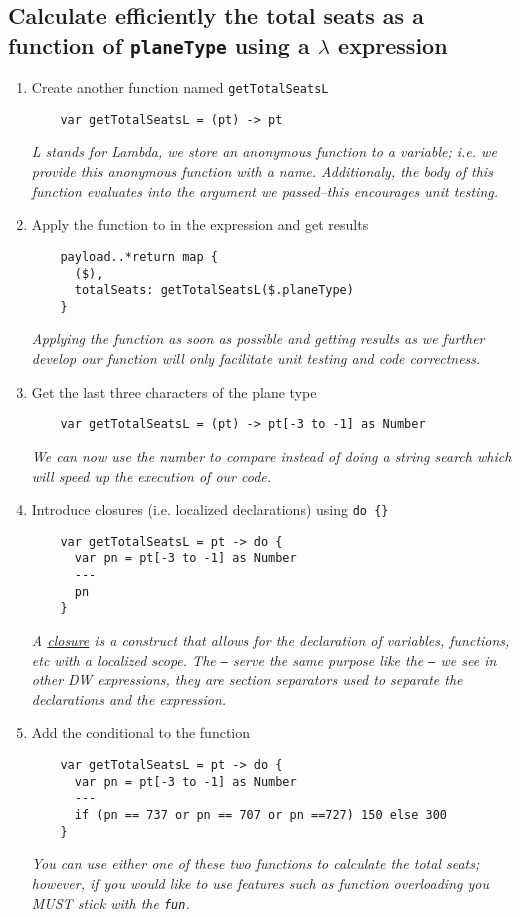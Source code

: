 \subsection{Calculate efficiently the total seats as a function of \texttt{planeType} using a $\lambda$ expression}
\begin{enumerate}[resume*]
\item Create another function named \texttt{getTotalSeatsL}
  \begin{lstlisting}
    var getTotalSeatsL = (pt) -> pt
  \end{lstlisting}
  \emph{
    L stands for Lambda, we store an anonymous function to a variable; i.e. we provide this anonymous function
    with a name.  Additionaly, the body of this function evaluates into the argument we passed--this encourages
    unit testing.
  }
\item Apply the function to in the expression and get results
  \begin{lstlisting}
    payload..*return map {
      ($),
      totalSeats: getTotalSeatsL($.planeType)
    }
  \end{lstlisting}
  \emph{
    Applying the function as soon as possible and getting results as we further develop our function
    will only facilitate unit testing and code correctness.
  }
\item Get the last three characters of the plane type
  \begin{lstlisting}
    var getTotalSeatsL = (pt) -> pt[-3 to -1] as Number
  \end{lstlisting}
  \emph{
    We can now use the number to compare instead of doing a string search which will speed up the execution of
    our code.
  }
\item Introduce closures (i.e. localized declarations) using \texttt{do \{\}}
  \begin{lstlisting}
    var getTotalSeatsL = pt -> do {
      var pn = pt[-3 to -1] as Number
      ---
      pn
    }
  \end{lstlisting}
  \emph{
    A \href{https://en.wikipedia.org/wiki/Closure_(computer_programming)}{closure} is a construct that allows for
    the declaration of variables, functions, etc with a localized scope.  The \texttt{---} serve the same purpose
    like the \texttt{---} we see in other DW expressions, they are section separators used to separate the
    declarations and the expression.
  }
\item Add the conditional to the function
  \begin{lstlisting}
    var getTotalSeatsL = pt -> do {
      var pn = pt[-3 to -1] as Number
      ---
      if (pn == 737 or pn == 707 or pn ==727) 150 else 300
    }    
  \end{lstlisting}
  \emph{
    You can use either one of these two functions to calculate the total seats; however, if you would like to use
    features such as function overloading you MUST stick with the \texttt{fun}.
  }
\end{enumerate}

